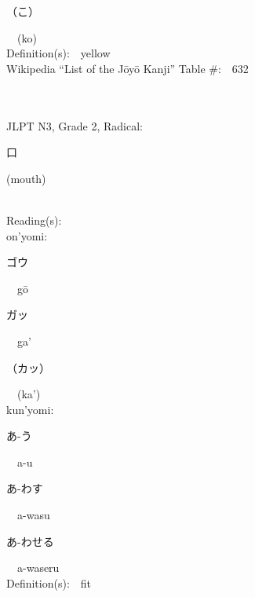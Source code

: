 \begin{multicols}{2}
{\hspace*{2em}}{\begin{CJK}{UTF8}{min} （こ） \end{CJK}}\ \ (ko)\ \ \\
Definition(s):\ \ yellow \\
Wikipedia ``List of the J\=oy\=o Kanji'' Table \#:\ \ 632 \\
\ \ \\
{\fontsize{34pt}{40pt}  }\ \ \\  %
{JLPT N3, Grade 2, Radical:\ \ {\begin{CJK}{UTF8}{min} 口 \end{CJK}} (mouth) } \\
Reading(s):\ \ \\
{\hspace*{1em}}on'yomi:\ \ \\
{\hspace*{2em}}{\begin{CJK}{UTF8}{min} ゴウ \end{CJK}}\ \ g\=o\ \ \\
{\hspace*{2em}}{\begin{CJK}{UTF8}{min} ガッ \end{CJK}}\ \ ga'\ \ \\
{\hspace*{2em}}{\begin{CJK}{UTF8}{min} （カッ） \end{CJK}}\ \ (ka')\ \ \\
{\hspace*{1em}}kun'yomi:\ \ \\
{\hspace*{2em}}{\begin{CJK}{UTF8}{min} あ-う \end{CJK}}\ \ a-u\ \ \\
{\hspace*{2em}}{\begin{CJK}{UTF8}{min} あ-わす \end{CJK}}\ \ a-wasu\ \ \\
{\hspace*{2em}}{\begin{CJK}{UTF8}{min} あ-わせる \end{CJK}}\ \ a-waseru\ \ \\
Definition(s):\ \ fit \\

\end{multicols}

